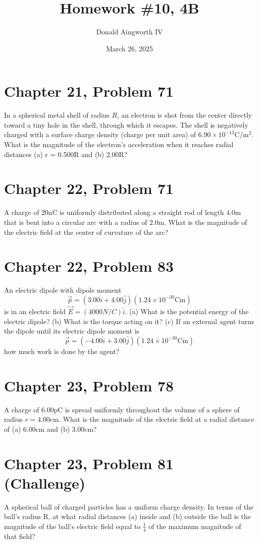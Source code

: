 \documentclass[12pt]{article}
\title{Homework \#10, 4B}
\author{Donald Aingworth IV}
\date{March 26, 2025}
\begin{document}

\section{Chapter 21, Problem 71}
In a spherical metal shell of radius $R$, an electron is shot from the center directly toward a tiny hole in the shell, through which it escapes. The shell is negatively charged with a surface charge density (charge per unit area) of $6.90 \times 10^{-13} \unit{\coulomb/\meter^2}$. What is the magnitude of the electron's acceleration when it reaches radial distances (a) r = 0.500R and (b) 2.00R?

\section{Chapter 22, Problem 71}
A charge of $20  \unit{\nano\coulomb}$ is uniformly distributed along a straight rod of length $4.0  \unit{\meter}$ that is bent into a circular arc with a radius of $2.0 \unit{\meter}$. What is the magnitude of the electric field at the center of curvature of the arc?

\section{Chapter 22, Problem 83}
An electric dipole with dipole moment
\[\vec{p} = (3.00\hat{i} + 4.00\hat{j})(1.24 \times 10^{-30} \unit{\coulomb\meter})\]
is in an electric field $\vec{E} = (4000 N/C)\hat{i}$. (a) What is the potential energy of the electric dipole? (b) What is the torque acting on it? (c) If an external agent turns the dipole until its electric dipole
moment is
\[\vec{p} = (-4.00\hat{i} + 3.00\hat{j})(1.24 \times 10^{-30} \unit{\coulomb\meter})\]
how much work is done by the agent?

\section{Chapter 23, Problem 78}
A charge of $6.00 \unit{\pico\coulomb}$ is spread uniformly throughout the volume of a sphere of radius $r = 4.00 \unit{\centi\meter}$. What is the magnitude of the electric field at a radial distance of (a) $6.00 \unit{\centi\meter}$ and (b) $3.00 \unit{\centi\meter}$?

\section{Chapter 23, Problem 81 (Challenge)}
A spherical ball of charged particles has a uniform charge density. In terms of the ball's radius R, at what radial distances (a) inside and (b) outside the ball is the magnitude of the ball's electric field equal to $\frac{1}{4}$ of the maximum magnitude of that field?
\end{document}
